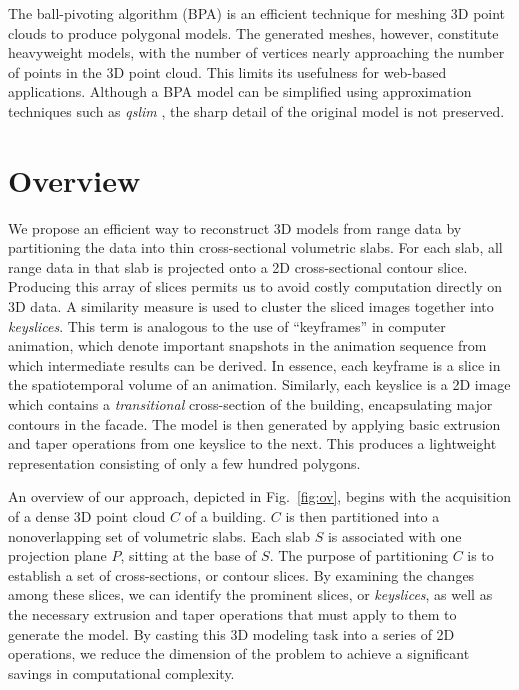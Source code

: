 \documentclass[review]{acmsiggraph}       %
\newcommand{\Fig}[1]{Fig.~\ref{fig:#1}}
\begin{document}
The ball-pivoting algorithm (BPA) \cite{BPA_BMRS} is an efficient technique
for meshing 3D point clouds to produce polygonal models.
The generated meshes, however, constitute heavyweight models,
with the number of vertices nearly approaching the number of points in the
3D point cloud.
This limits its usefulness for web-based applications.
Although a BPA model can be simplified using approximation techniques such as
{\it qslim} \cite{BPA_GH}, the sharp detail of the original model is not
preserved.

\section{Overview}

We propose an efficient way to reconstruct 3D models from range data by
partitioning the data into thin cross-sectional volumetric slabs.
For each slab, all range data in that slab is projected onto a 2D
cross-sectional contour slice.
Producing this array of slices permits us to avoid costly computation directly
on 3D data.
A similarity measure \cite{IR_Brown} is used to cluster the sliced images
together into {\it keyslices}.
This term is analogous to the use of ``keyframes'' in computer animation,
which denote important snapshots in the animation sequence from which
intermediate results can be derived.
In essence, each keyframe is a slice in the spatiotemporal volume of
an animation.
Similarly, each keyslice is a 2D image which contains a {\it transitional}
cross-section of the building, encapsulating major contours in the facade.
The model is then generated by applying basic extrusion and taper
operations from one keyslice to the next.
This produces a lightweight representation consisting of only a few
hundred polygons.

An overview of our approach, depicted in \Fig{ov}, begins with the
acquisition of a dense 3D point cloud $C$ of a building.
$C$ is then partitioned into a nonoverlapping set of volumetric slabs.
Each slab $S$ is associated with one projection plane $P$,
sitting at the base of $S$.
The purpose of partitioning $C$ is to establish a set of cross-sections,
or contour slices.
By examining the changes among these slices, we can identify the prominent
slices, or {\it keyslices}, as well as the necessary extrusion and
taper operations that must apply to them to generate the model.
By casting this 3D modeling task into a series of 2D operations, we
reduce the dimension of the problem to achieve a significant savings in
computational complexity.
\end{document}
